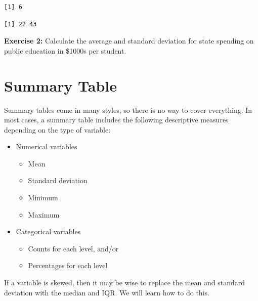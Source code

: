 \documentclass[
]{book}
\makeatletter
\newenvironment{Shaded}{\begin{snugshade}}{\end{snugshade}}
\newcommand{\FunctionTok}[1]{\textcolor[rgb]{0,0,0}{#1}}
\newcommand{\NormalTok}[1]{#1}
\newcommand{\SpecialCharTok}[1]{\textcolor[rgb]{0,0,0}{#1}}
\providecommand{\tightlist}{%
  \setlength{\itemsep}{0pt}\setlength{\parskip}{0pt}}
\newenvironment{kframe}{%
\medskip{}
\setlength{\fboxsep}{.8em}
 \def\at@end@of@kframe{}%
 \ifinner\ifhmode%
  \def\at@end@of@kframe{\end{minipage}}%
  \begin{minipage}{\columnwidth}%
 \fi\fi%
 \def\FrameCommand##1{\hskip\@totalleftmargin \hskip-\fboxsep
 \colorbox{shadecolor}{##1}\hskip-\fboxsep
     \hskip-\linewidth \hskip-\@totalleftmargin \hskip\columnwidth}%
 \MakeFramed {\advance\hsize-\width
   \@totalleftmargin\z@ \linewidth\hsize
   \@setminipage}}%
 {\par\unskip\endMakeFramed%
 \at@end@of@kframe}
\renewenvironment{Shaded}{\begin{kframe}}{\end{kframe}}
\newenvironment{rmdblock}[1]
  {\begin{shaded*}
  }
  {\end{shaded*}
  }
\newenvironment{learncheck}
  {\begin{rmdblock}{warning}}
  {\end{rmdblock}}
\makeatother
\begin{document}
\begin{verbatim}
[1] 6
\end{verbatim}

\begin{Shaded}
\end{Shaded}

\begin{verbatim}
[1] 22 43
\end{verbatim}

\begin{learncheck}
\textbf{Exercise 2:} Calculate the average and standard deviation for
state spending on public education in \$1000s per student.
\end{learncheck}

\hypertarget{summary-table}{%
\section{Summary Table}\label{summary-table}}

Summary tables come in many styles, so there is no way to cover everything. In most cases, a summary table includes the following descriptive measures depending on the type of variable:

\begin{itemize}
\tightlist
\item
  Numerical variables

  \begin{itemize}
  \tightlist
  \item
    Mean
  \item
    Standard deviation
  \item
    Minimum
  \item
    Maximum
  \end{itemize}
\item
  Categorical variables

  \begin{itemize}
  \tightlist
  \item
    Counts for each level, and/or
  \item
    Percentages for each level
  \end{itemize}
\end{itemize}

If a variable is skewed, then it may be wise to replace the mean and standard deviation with the median and IQR. We will learn how to do this.
\end{document}
